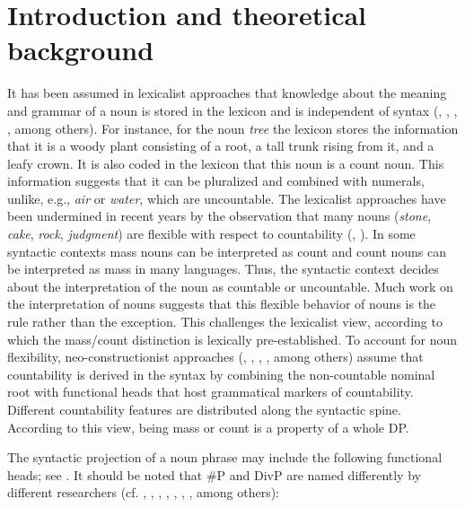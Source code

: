 \documentclass[output=paper,colorlinks,citecolor=brown,
]{langscibook}
\begin{document}

\section{Introduction and theoretical background}

It has been assumed in lexicalist approaches that knowledge about the meaning and grammar of a noun is stored in the lexicon and is independent of syntax (\citealt{DiSciulloWilliams1987}, \citealt{Zimmermann1983}, \citealt{Zimmermann1988}, \citealt{Wasow1977}, among others). For instance, for the noun \textit{tree} the lexicon stores the information that it is a woody plant consisting of a root, a tall trunk rising from it, and a leafy crown. It is also coded in the lexicon that this noun is a count noun. This information suggests that it can be pluralized and combined with numerals, unlike, e.g., \textit{air} or \textit{water}, which are uncountable. The lexicalist approaches have been undermined in recent years by the observation that many nouns (\textit{stone}, \textit{cake}, \textit{rock}, \textit{judgment}) are flexible with respect to countability (\citealt{KissPelletier2014}, \citealt{Zamparelli2017}). In some syntactic contexts mass nouns can be interpreted as count and count nouns can be interpreted as mass in many languages. Thus, the syntactic context decides about the interpretation of the noun as countable or uncountable. Much work on the interpretation of nouns suggests that this flexible behavior of nouns is the rule rather than the exception. This challenges the lexicalist view, according to which the mass/count distinction is lexically pre-established. To account for noun flexibility, neo-constructionist approaches (\citealt{Marantz1997}, \citealt{Borer2003}, \citealt{Borer2005}, \citealt{Kratzer2007}, among others) assume that countability is derived in the syntax by combining the non-countable nominal root with functional heads that host grammatical markers of countability. Different countability features are distributed along the syntactic spine. According to this view, being mass or count is a property of a whole DP. 

The syntactic projection of a noun phrase may include the following functional heads; see . It should be noted that \#P and DivP are named differently by different researchers (cf. \citealt{AlexiadouStavrou2007}, \citealt{Borer2005}, \citealt{ChengSybesma1999,ChengSybesma2014}, \citealt{ChengZamparelli2017}, \citealt{Mathieu2012}, \citealt{Wiltschko2008}, \citealt{Zamparelli2000}, among others):
\end{document}
